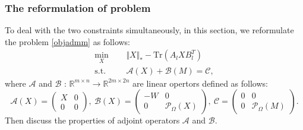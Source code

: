 \documentclass{article}
\begin{document}
{\subsubsection{The reformulation of problem }
To deal with the two constraints simultaneously, in this section, we reformulate the problem \ref{objadmm} as follows:
\begin{equation}
	\label{apobj}
	\begin{aligned}
		\underset{X}{\min} \ \ \ \ & \ \  \Vert X \Vert_* - \text{Tr}(A_lXB_l^T) \\
		\text{s.t.} \ \ \ \ & \ \    \mathcal{A}(X) + \mathcal{B}(M) = \mathcal{C},
	\end{aligned}
\end{equation}
where $\mathcal{A}$ and $\mathcal{B}$ : $\mathbb{R}^{m\times n} \rightarrow \mathbb{R}^{2m\times 2n}$ are linear opertors defined as follows:
\begin{equation*}
	\mathcal{A}(X) = \begin{pmatrix}
		X & 0 \\
		0 & 0
	\end{pmatrix}, \
	\mathcal{B}(X) = \begin{pmatrix}
		-W & 0 \\
		0 & \mathcal{P}_\Omega(X)
	\end{pmatrix}, \ 
	\mathcal{C} = \begin{pmatrix}
		0 & 0 \\
		0 & \mathcal{P}_\Omega(M)
	\end{pmatrix}.
\end{equation*}
Then discuss the properties of adjoint operators $\mathcal{A}$ and $\mathcal{B}$.

}
\end{document}
